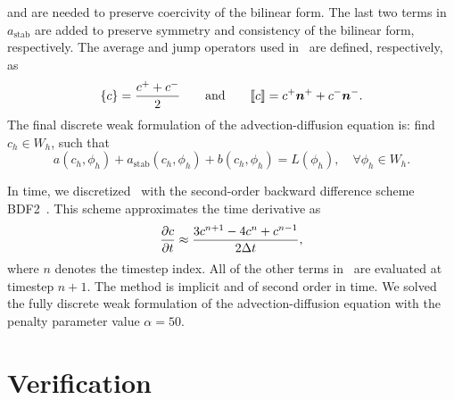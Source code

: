 \documentclass{WileyMSP-template}
\begin{document}
and are needed to preserve coercivity of the bilinear form.
The last two terms in $a_{\mathrm{stab}}$ are
added to preserve symmetry and consistency of the bilinear form, respectively.
The average and jump operators used
in~ are defined, respectively, as
\begin{equation*}
    \{c\} = \frac{c^+ + c^-}{2} \qquad\mathrm{and}\qquad \llbracket c\rrbracket = c^+\bm{n}^+ + c^-\bm{n}^-.
\end{equation*}
The final discrete weak formulation of the advection-diffusion equation is:
find $c_h\in W_h$, such that
\begin{equation}
    a(c_h, \phi_h) + a_{\mathrm{stab}}(c_h, \phi_h) + b(c_h, \phi_h) = L(\phi_h),
    \quad\forall\phi_h\in W_h.
    \label{eq:discrete_weak_form_adv_diff}
\end{equation}

In time, we discretized~ with the
second-order backward difference scheme BDF2~\cite{Volker2016}. This scheme
approximates the time derivative as
\begin{equation*}
    \frac{\partial c}{\partial t} \approx \frac{3c^{n+1} - 4c^n + c^{n-1}}{2\Delta t},
\end{equation*}
where $n$ denotes the timestep index. All of the other terms
in~ are evaluated at timestep $n+1$.
The method is implicit and of second order in time. We solved the fully
discrete weak formulation of the advection-diffusion equation
with the penalty parameter value $\alpha=50$.

\section{Verification}\label{sec:appB_verification}
\end{document}
